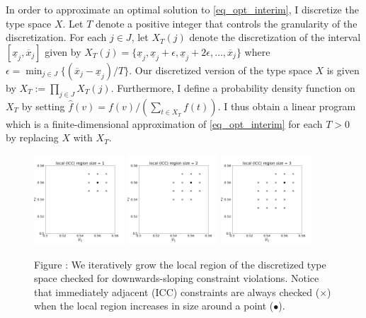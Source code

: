 In order to approximate an optimal solution to \ref{eq_opt_interim}, I discretize the type space $X$. Let $T$ denote a positive integer that controls the granularity of the discretization. For each $j \in J$, let $X_T(j)$ denote the discretization of the interval $[\underline{x}_j,\overline{x}_j]$ given by $X_T(j) = \{\underline{x}_j, \underline{x}_j + \epsilon, \underline{x}_j + 2\epsilon, \dots, \overline{x}_j\}$ where $\epsilon = \min_{j \in J} \{(\overline{x}_j - \underline{x}_j) / T\}$. Our discretized version of the type space $X$ is given by $X_T := \prod_{j \in J} X_T(j)$. Furthermore, I define a probability density function on $X_T$ by setting $\hat{f}(v) = f(v) / (\sum_{t \in X_T} f(t))$. I thus obtain a linear program which is a finite-dimensional approximation of \ref{eq_opt_interim} for each $T > 0$ by replacing $X$ with $X_T$.

\begin{figure}[t]
    \begin{center}
    \includegraphics[width=0.3\textwidth]{images/local_size_1.png}
    \includegraphics[width=0.3\textwidth]{images/local_size_2.png}
    \includegraphics[width=0.3\textwidth]{images/local_size_3.png}
    \end{center}
    
    \vspace{1mm}
    \raggedright{\small {\sc Figure \thefig\label{fig:sim1}:} We iteratively grow the local region of the discretized type space checked for downwards-sloping constraint violations. Notice that immediately adjacent (ICC) constraints are always checked ($\times$) when the local region increases in size around a point ($\bullet$).}
\end{figure}


